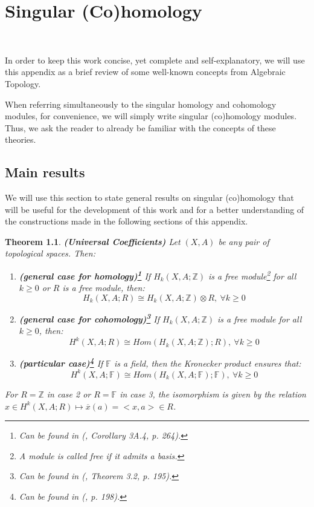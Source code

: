 \documentclass[12pt,oneside]{book}
\newtheorem{teo}    {Theorem}[chapter]
\newcommand{\Z}{\mathbb{Z}}
\newcommand{\F}{\mathbb{F}}
\newcommand{\tensor}{\otimes}
\begin{document}
    \appendix

    \chapter{Singular (Co)homology}\label{ap_(co)_sing}
    \thispagestyle{empty}

    \

    In order to keep this work concise, yet complete and self-explanatory, we will use this appendix as 
    a brief review of some well-known concepts from Algebraic Topology.

    When referring simultaneously to the singular homology and cohomology modules, for convenience, we 
    will simply write singular (co)homology modules. Thus, we ask the 
    reader to already be familiar with the concepts of these theories.
    
    \section{Main results}\label{ap_principais_res}
    
    We will use this section to state general results on singular (co)homology that will be useful for 
    the development of this work and for a better understanding of the constructions made in the 
    following sections of this appendix.
    
    \begin{teo}{\bf (Universal Coefficients)}
        Let $(X,A)$ be any pair of topological spaces. Then:
        \begin{enumerate}
            \item \textbf{(general case for homology)\footnote{Can be found in (\cite{hatcher}, 
            Corollary 3A.4, p. 264).}} If $H_{k}(X,A;\Z)$ is a free 
            module\footnote{A module is called free if it admits a basis.} for 
            all $k\geq 0$ or $R$ is a free module, then:
            $$ H_{k}(X,A;R)\cong H_{k}(X,A;\Z)\tensor R, \ \forall k\geq 0 $$
            \item \textbf{(general case for cohomology)\footnote{Can be found in (\cite{hatcher}, 
            Theorem 3.2, p. 195).}} If $H_{k}(X,A;\Z)$ is a free module for all $k\geq 0$, then:
            $$ H^{k}(X,A;R)\cong Hom(H_{k}(X,A;\Z);R), \ \forall k\geq 0 $$
            \item \textbf{(particular case)\footnote{Can be found in (\cite{hatcher}, p. 198).}} 
            If $\mathbb{F}$ is a field, then the Kronecker product ensures that:
            $$ H^{k}(X,A;\F)\cong Hom(H_{k}(X,A;\F);\F), \ \forall k\geq 0 $$
        \end{enumerate}
        For $R=\Z$ in case 2 or $R=\F$ in case 3, the isomorphism is given by the relation 
        $x\in H^{k}(X,A;R)\mapsto\overline{x}(a)=<x,a>\in R$.
    \end{teo}
    
\end{document}
